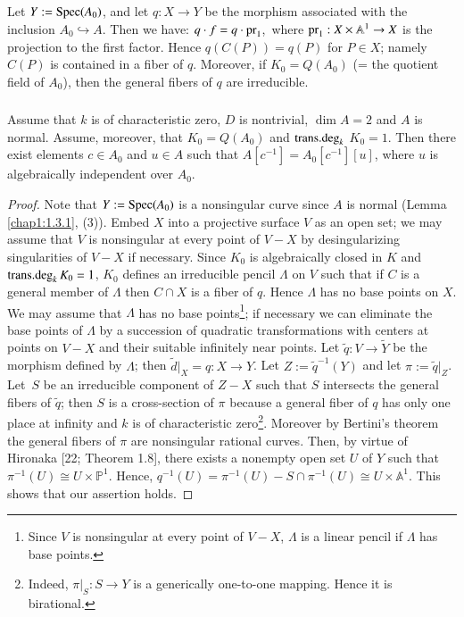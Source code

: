 \subsection{}\label{chap1:2.2}
Let $Y:=\operatorname{Spec}(A_{0})$, and let $q:X\to Y$ be the morphism associated
with the inclusion $A_{0}\hookrightarrow A$. Then we have: $q\cdot
f=q\cdot \operatorname{pr}_{1}$,\pageoriginale\ where
$\operatorname{pr}_{1}:X\times\mathbb{A}^{1}\to X$ is the projection to the first
factor. Hence $q(C(P))=q(P)$ for $P\in X$; namely $C(P)$ is contained
in a fiber of $q$. Moreover, if $K_{0}=Q(A_{0})$ (= the quotient field
of $A_{0}$), then the general fibers of $q$ are irreducible.

\subsubsection{}\label{chap1:2.2.1}
\begin{lemma*}
Assume that $k$ is of characteristic zero, $D$ is nontrivial, $\dim
A=2$ and $A$ is normal. Assume, moreover, that $K_{0}=Q(A_{0})$ and
$\operatorname{trans{.}deg}_{k}$ $K_{0}=1$. Then there exist elements $c\in
A_{0}$ and $u\in A$ such that $A[c^{-1}]=A_{0}[c^{-1}][u]$, where $u$
is algebraically independent over $A_{0}$.
\end{lemma*}

\begin{proof}
Note that $Y:=\operatorname{Spec}(A_{0})$ is a nonsingular curve since $A$ is normal
(\cf Lemma \ref{chap1:1.3.1}, (3)). Embed $X$ into a projective surface
$V$ as an open set; we may assume that $V$ is nonsingular at every
point of $V-X$ by desingularizing singularities of $V-X$ if
necessary. Since $K_{0}$ is algebraically closed in $K$ and
$\operatorname{trans{.}deg}_{k}K_{0}=1$, $K_{0}$ defines an irreducible pencil
$\Lambda$ on $V$ such that if $C$ is a general member of $\Lambda$
then $C\cap X$ is a fiber of $q$. Hence $\Lambda$ has no base points
on $X$. We may assume that $\Lambda$ has no base
points\footnote[2]{Since $V$ is nonsingular at every point of $V-X$,
  $\Lambda$ is a linear pencil if $\Lambda$ has base points.}; if
necessary we can eliminate the base points of $\Lambda$ by a
succession of quadratic transformations with centers at points on
$V-X$ and their suitable infinitely near points. Let
$\widetilde{q}:V\to \widetilde{Y}$ be the morphism defined by
$\Lambda$; then $\widetilde{d}|_{X}=q:X\to Y$. Let
$Z:=\widetilde{q}^{-1}(Y)$ and let
$\pi:=\widetilde{q}|_{Z}$. Let\pageoriginale\ $S$ be an irreducible
component of $Z-X$ such that $S$ intersects the general fibers of
$\widetilde{q}$; then $S$ is a cross-section of $\pi$ because a
general fiber of $q$ has only one place at infinity and $k$ is of
characteristic zero\footnote{Indeed, $\pi|_{S}:S\to Y$ is a
  generically one-to-one mapping. Hence it is birational.}. Moreover
by Bertini's theorem the general fibers of $\pi$ are nonsingular
rational curves. Then, by virtue of Hironaka [22; Theorem 1.8], there
exists a nonempty open set $U$ of $Y$ such that $\pi^{-1}(U)\cong
U\times \mathbb{P}^{1}$. Hence, $q^{-1}(U)=\pi^{-1}(U)-S\cap
\pi^{-1}(U)\cong U\times\mathbb{A}^{1}$. This shows that our assertion
holds.
\end{proof}

